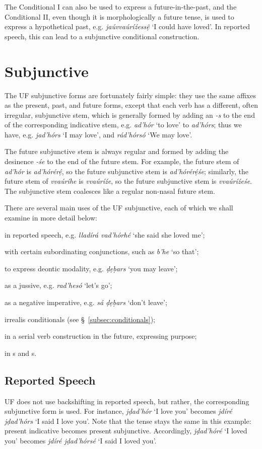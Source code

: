 \documentclass[a4paper, 12pt, twoside, openright, final]{book}
\newlength{\EnumItemSep} \EnumItemSep-3pt
\newenvironment { enum } [1] [0] {
    \vspace { -.5em }
    \settowidth \leftmargini { 99.\hskip\labelsep }
    \begin { enumerate }
    \setcounter { enumi } { #1 }
    \itemsep \EnumItemSep
} {
    \end { enumerate }
    \vspace { -.5em }
}
\let \w \textit
\begin{document}
The Conditional I can also be used to express a future-in-the-past, and the Conditional II, even though it is
morphologically a future tense, is used to express a hypothetical past, e.g. \w{jaúvvaúríźessệ} ‘I could have loved’.
In reported speech, this can lead to a subjunctive conditional construction.


\section{Subjunctive}\label{subsec:subjunctive}
The UF subjunctive forms are fortunately fairly simple: they use the same affixes as the present, past, and future
forms, except that each verb has a different, often irregular, subjunctive stem, which is generally formed
by adding an \w{-s} to the end of the corresponding indicative stem, e.g. \w{ad’hór} ‘to love’ to \w{ad’hórs};
thus we have, e.g. \w{jad’hórs} ‘I may love’, and \w{rád’hórsó} ‘We may love’.

The future subjunctive stem is always regular and formed by adding the desinence \w{-śe} to the end of the future stem. For example,
the future stem of \w{ad’hór} is \w{ad’hórérẹ́}, so the future subjunctive stem is \w{ad’hórérẹ́śe}; similarly, the future
stem of \w{vvaúríhe} is \w{vvaúríźe}, so the future subjunctive stem is \w{vvaúríźeśe}. The subjunctive stem coalesces like
a regular non-nasal future stem.

There are several main uses of the UF subjunctive, each of which we shall examine in more detail below:
\begin{enum}
\item in reported speech, e.g. \w{lladírá vad’hórhé} ‘she said she loved me’;
\item with certain subordinating conjunctions, such as \w{b’he} ‘so that’;
\item to express deontic modality, e.g. \w{ḍẹḅars} ‘you may leave’;
\item as a jussive, e.g. \w{rad’hesó} ‘let’s go’;
\item as a negative imperative, e.g. \w{sá ḍẹḅars} ‘don’t leave’;
\item irrealis conditionals (see §~\ref{subsec:conditionals});
\item in a serial verb construction in the future, expressing purpose;
\item in s and s.
\end{enum}

\subsection{Reported Speech}
UF does not use backshifting in reported speech, but rather, the corresponding subjunctive form is used. For instance,
\w{jḍad’hór} ‘I love you’ becomes \w{jdíré jḍad’hórs} ‘I said I love you’. Note that the tense stays the same in this
example: present indicative becomes present subjunctive. Accordingly, \w{jḍad’hóré} ‘I loved you’ becomes \w{jdíré
jḍad’hórsé} ‘I said I loved you’.
\end{document}
